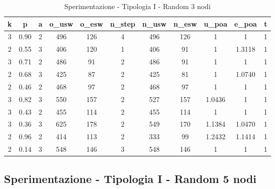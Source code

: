 \begin{table}[H]
\centering
\scalebox{0.9} {
\begin{tabular}{|c|c|c|c|c|c|c|c|c|c|c|}
\hline
\textbf{k} & \textbf{p} & \textbf{a} & \textbf{o\_usw} & \textbf{o\_esw} & \textbf{n\_step} & \textbf{n\_usw} & \textbf{n\_esw} & \textbf{u\_poa} & \textbf{e\_poa} & \textbf{t} \\ \hline
3 & 0.90 & 2 & 496 & 126 & 4 & 496 & 126 & 1 & 1 & 1 \\ \hline
2 & 0.55 & 3 & 406 & 120 & 1 & 406 & 91 & 1 & 1.3118 & 1 \\ \hline
3 & 0.71 & 2 & 486 & 91 & 2 & 486 & 91 & 1 & 1 & 1 \\ \hline
2 & 0.68 & 3 & 425 & 87 & 2 & 425 & 81 & 1 & 1.0740 & 1 \\ \hline
2 & 0.46 & 2 & 468 & 97 & 2 & 468 & 97 & 1 & 1 & 1 \\ \hline
3 & 0.82 & 3 & 550 & 157 & 2 & 527 & 157 & 1.0436 & 1 & 1 \\ \hline
3 & 0.43 & 2 & 455 & 114 & 2 & 455 & 114 & 1 & 1 & 1 \\ \hline
3 & 0.36 & 3 & 625 & 178 & 2 & 549 & 170 & 1.1384 & 1.0470 & 1 \\ \hline
2 & 0.96 & 2 & 414 & 113 & 2 & 333 & 99 & 1.2432 & 1.1414 & 1 \\ \hline
2 & 0.14 & 3 & 548 & 146 & 3 & 548 & 146 & 1 & 1 & 1 \\ \hline
\end{tabular}
}
\caption{Sperimentazione - Tipologia I - Random 3 nodi}
\label{tab:sperimentazione-tipo1-3nodi}
\end{table}


\subsection{Sperimentazione - Tipologia I - Random 5 nodi}

